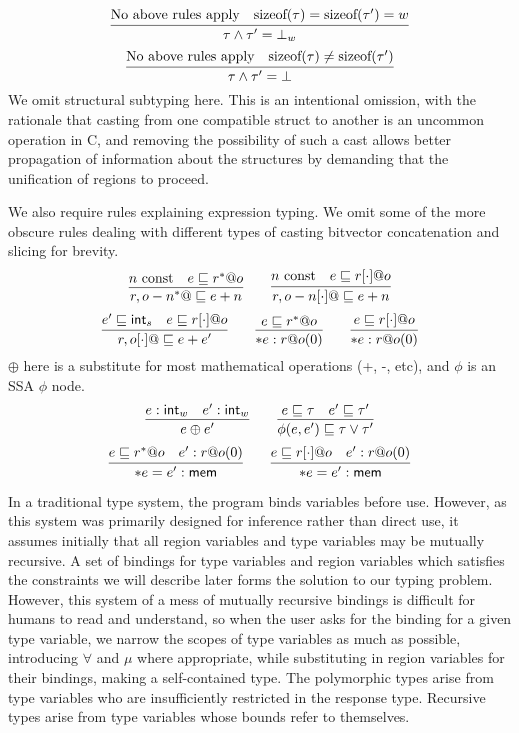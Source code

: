 \[
\infer{\tau \wedge \tau' = \bot_{w}}{\textrm{No above rules apply} & \textrm{sizeof}(\tau) = \textrm{sizeof}(\tau') = w}
\]
\[
\infer{\tau \wedge \tau' = \ubot}{\textrm{No above rules apply} & \textrm{sizeof}(\tau) \neq \textrm{sizeof}(\tau')}
\]
We omit structural subtyping here. This is an intentional omission, with the rationale that casting from one compatible struct to another is an uncommon operation in C, and removing the possibility of such a cast allows better propagation of information about the structures by demanding that the unification of regions to proceed.

We also require rules explaining expression typing. We omit some of the more obscure rules dealing with different types of casting bitvector concatenation and slicing for brevity.
\[
\infer{\lptr{r,o-n} \subt e + n}{n\ \textrm{const} & e \subt \lptr{r}{o}}
\qquad
\infer{\aptr{r,o-n} \subt e + n}{n\ \textrm{const} & e \subt \aptr{r}{o}}
\]
\[
\infer{\aptr{r,o} \subt e + e'}{e' \subt \tint{s} & e \subt \aptr{r}{o}}
\qquad
\infer{*e : r@o(0)}{e \subt \lptr{r}{o}}
\qquad
\infer{*e : r@o(0)}{e \subt \aptr{r}{o}}
\]
$\oplus$ here is a substitute for most mathematical operations (+, -, etc), and $\phi$ is an SSA $\phi$ node.
\[
\infer{e \oplus e'}{e : \tint{w} & e' : \tint{w}} \qquad \infer{\phi(e, e') \subt \tau \vee \tau'}{e \subt \tau & e' \subt \tau'}
\]
\[
\infer{*e = e' : \mem}{e \subt \lptr{r}{o} & e' : r@o(0)}
\qquad
\infer{*e = e' : \mem}{e \subt \aptr{r}{o} & e' : r@o(0)}
\]

In a traditional type system, the program binds variables before use. However, as this system was primarily designed for inference rather than direct use, it assumes initially that all region variables and type variables may be mutually recursive. A set of bindings for type variables and region variables which satisfies the constraints we will describe later forms the solution to our typing problem. However, this system of a mess of mutually recursive bindings is difficult for humans to read and understand, so when the user asks for the binding for a given type variable, we narrow the scopes of type variables as much as possible, introducing $\forall$ and $\mu$ where appropriate, while substituting in region variables for their bindings, making a self-contained type. The polymorphic types arise from type variables who are insufficiently restricted in the response type. Recursive types arise from type variables whose bounds refer to themselves.

